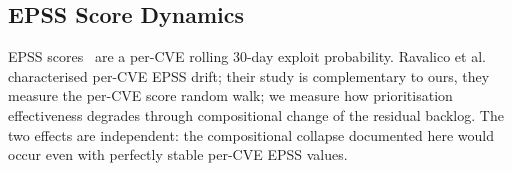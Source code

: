 \subsection{EPSS Score Dynamics}

EPSS scores~\cite{jacobs2021epss} are a per-CVE rolling 30-day exploit
probability. Ravalico et al.~\cite{ravalico2025epsstemporal} characterised
per-CVE EPSS drift; their study is complementary to ours, they measure
the per-CVE score random walk; we measure how prioritisation effectiveness
degrades through compositional change of the residual backlog. The two
effects are independent: the compositional collapse documented here would
occur even with perfectly stable per-CVE EPSS values.
